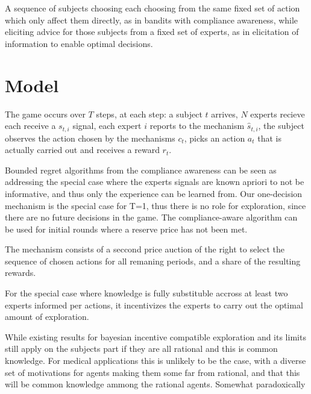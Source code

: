 

 A sequence of subjects choosing each choosing from the same fixed set of action which only affect them directly, as in bandits with compliance awareness, while eliciting advice for those subjects from a fixed set of experts, as in elicitation of information to enable optimal decisions. 

\section{Model}

The game occurs over $T$ steps, at each step: a subject $t$ arrives, $N$ experts recieve each receive a $s_{t,i}$ signal, each expert $i$ reports to the mechanism $\hat{s}_{t,i}$, the subject observes the action chosen by the mechanisms $c_t$, picks an action $a_t$ that is actually carried out and receives a reward $r_t$.


Bounded regret algorithms from the compliance awareness can be seen as addressing the special case where the experts signals are known apriori to not be informative, and thus only the experience can be learned from. Our one-decision mechanism is the special case for T=1, thus there is no role for exploration, since there are no future decisions in the game.
The compliance-aware algorithm can be used for initial rounds where a reserve price has not been met.

The mechanism consists of a seccond price auction of the right to select the sequence of chosen actions for all remaning periods, and a share of the resulting rewards.

For the special case where knowledge is  fully substituble accross at least two experts informed per actions, it incentivizes the experts to carry out the optimal amount of exploration. 

While existing results for bayesian incentive compatible exploration and its limits still apply on the subjects part if they are all rational and this is common knowledge. For medical applications this is unlikely to be the case, with a diverse set of motivations for agents making them some far from rational, and that this will be common knowledge ammong the rational agents. Somewhat paradoxically 




